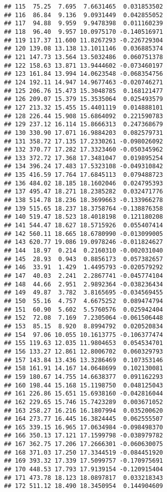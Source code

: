 \documentclass[]{book}
\theoremstyle{definition}
\theoremstyle{definition}
\theoremstyle{definition}
\theoremstyle{remark}
\begin{document}
\begin{verbatim}
## 115  75.25  7.695  7.6631465  0.031853502
## 116  86.84  9.136  9.0931449  0.042855052
## 117  94.88  9.959  9.9478398  0.011160239
## 118  96.40  9.957 10.0975170 -0.140516971
## 119 117.37 11.600 11.8267293 -0.226729304
## 120 139.08 13.138 13.1011146  0.036885374
## 121 147.73 13.564 13.5032486  0.060751378
## 122 158.63 13.871 13.9444602 -0.073460197
## 123 161.84 13.994 14.0623548 -0.068354756
## 124 192.11 14.947 14.9677463 -0.020746271
## 125 206.76 15.473 15.3048785  0.168121477
## 126 209.07 15.379 15.3535064  0.025493579
## 127 213.32 15.455 15.4401119  0.014888101
## 128 226.44 15.908 15.6864092  0.221590783
## 129 237.12 16.114 15.8666313  0.247368679
## 130 330.90 17.071 16.9884203  0.082579731
## 131 358.72 17.135 17.2330261 -0.098026092
## 132 370.77 17.282 17.3323460 -0.050345962
## 133 372.72 17.368 17.3481047  0.019895254
## 134 396.24 17.483 17.5323108 -0.049310842
## 135 416.59 17.764 17.6845113  0.079488723
## 136 484.02 18.185 18.1602046  0.024795393
## 137 495.47 18.271 18.2385282  0.032471776
## 138 514.78 18.236 18.3699663 -0.133966278
## 139 515.65 18.237 18.3758764 -0.138876358
## 140 519.47 18.523 18.4018198  0.121180208
## 141 544.47 18.627 18.5715926  0.055407414
## 142 560.11 18.665 18.6780990 -0.013099005
## 143 620.77 19.086 19.0978246 -0.011824627
## 144  18.97  0.214  0.2160310 -0.002031040
## 145  28.93  0.943  0.8856173  0.057382657
## 146  33.91  1.429  1.4495793 -0.020579292
## 147  40.03  2.241  2.2867741 -0.045774104
## 148  44.66  2.951  2.9892364 -0.038236434
## 149  49.87  3.782  3.8165695 -0.034569455
## 150  55.16  4.757  4.6675252  0.089474794
## 151  60.90  5.602  5.5760576  0.025942404
## 152  72.08  7.169  7.2305064 -0.061506448
## 153  85.15  8.920  8.8994792  0.020520834
## 154  97.06 10.055 10.1613775 -0.106377474
## 155 119.63 12.035 11.9804653  0.054534701
## 156 133.27 12.861 12.8006702  0.060329793
## 157 143.84 13.436 13.3286469  0.107353146
## 158 161.91 14.167 14.0648699  0.102130081
## 159 180.67 14.755 14.6638377  0.091162293
## 160 198.44 15.168 15.1198750  0.048125043
## 161 226.86 15.651 15.6938160 -0.042816044
## 162 229.65 15.746 15.7423289  0.003671052
## 163 258.27 16.216 16.1807994  0.035200620
## 164 273.77 16.445 16.3824445  0.062555507
## 165 339.15 16.965 17.0634984 -0.098498370
## 166 350.13 17.121 17.1599798 -0.038979782
## 167 362.75 17.206 17.2666301 -0.060630075
## 168 371.03 17.250 17.3344519 -0.084451920
## 169 393.32 17.339 17.5099757 -0.170975691
## 170 448.53 17.793 17.9139154 -0.120915404
## 171 473.78 18.123 18.0897817  0.033218343
## 172 511.12 18.490 18.3450954  0.144904609

\end{verbatim}
\end{document}
